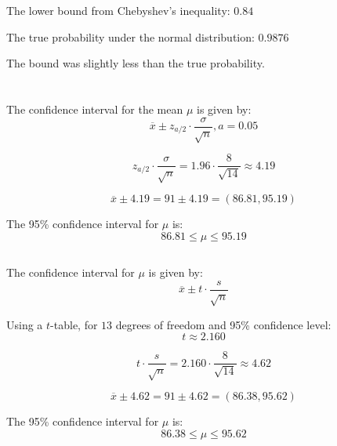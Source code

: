 \documentclass{homework}
\begin{document}
The lower bound from Chebyshev's inequality: \( 0.84 \)

The true probability under the normal distribution: \( 0.9876 \)

The bound was slightly less than the true probability.

\section{}

\subsection{}

The confidence interval for the mean \(\mu\) is given by:
\[
\overline{x} \pm z_{a/2} \cdot \frac{\sigma}{\sqrt{n}}, a = 0.05
\]

\[
z_{a/2} \cdot \frac{\sigma}{\sqrt{n}} = 1.96 \cdot \frac{8}{\sqrt{14}} \approx 4.19
\]

\[
\overline{x} \pm 4.19 = 91 \pm 4.19 = (86.81, 95.19)
\]

The 95\% confidence interval for \(\mu\) is:
\[
86.81 \leq \mu \leq 95.19
\]

\subsection{}

The confidence interval for \(\mu\) is given by:
\[
\overline{x} \pm t \cdot \frac{s}{\sqrt{n}}
\]




Using a \(t\)-table, for \(13\) degrees of freedom and 95\% confidence level:
\[
t \approx 2.160
\]

\[
t \cdot \frac{s}{\sqrt{n}} = 2.160 \cdot \frac{8}{\sqrt{14}} \approx 4.62
\]

\[
\overline{x} \pm 4.62 = 91 \pm 4.62 = (86.38, 95.62)
\]

The 95\% confidence interval for \(\mu\) is:
\[
86.38 \leq \mu \leq 95.62
\]

\section{}
\end{document}
